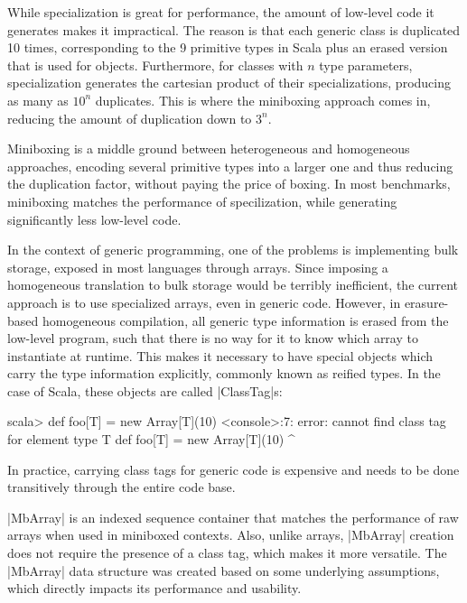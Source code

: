 While specialization is great for performance, the amount of low-level code it generates makes it impractical. The reason is that each generic class is duplicated 10 times, corresponding to the 9 primitive types in Scala plus an erased version that is used for objects. Furthermore, for classes with $n$ type parameters, specialization generates the cartesian product of their specializations, producing as many as $10^n$ duplicates. This is where the miniboxing approach comes in, reducing the amount of duplication down to $3^n$.

Miniboxing is a middle ground between heterogeneous and homogeneous approaches, encoding several primitive types into a larger one and thus reducing the duplication factor, without paying the price of boxing. In most benchmarks, miniboxing matches the performance of specilization, while generating significantly less low-level code.


In the context of generic programming, one of the problems is implementing bulk storage, exposed in most languages through arrays. Since imposing a homogeneous translation to bulk storage would be terribly inefficient, the current approach is to use specialized arrays, even in generic code. However, in erasure-based homogeneous compilation, all generic type information is erased from the low-level program, such that there is no way for it to know which array to instantiate at runtime. This makes it necessary to have special objects which carry the type information explicitly, commonly known as reified types. In the case of Scala, these objects are called |ClassTag|s:

\begin{lstlisting-nobreak}
scala>  def foo[T] = new Array[T](10)
<console>:7: error: cannot find class tag for element type T
        def foo[T] = new Array[T](10)
                     ^
\end{lstlisting-nobreak}

\noindent In practice, carrying class tags for generic code is expensive and needs to be done transitively through the entire code base.

|MbArray| is an indexed sequence container that matches the performance of raw arrays when used in miniboxed contexts. Also, unlike arrays, |MbArray| creation does not require the presence of a class tag, which makes it more versatile. The |MbArray| data structure was created based on some underlying assumptions, which directly impacts its performance and usability.

